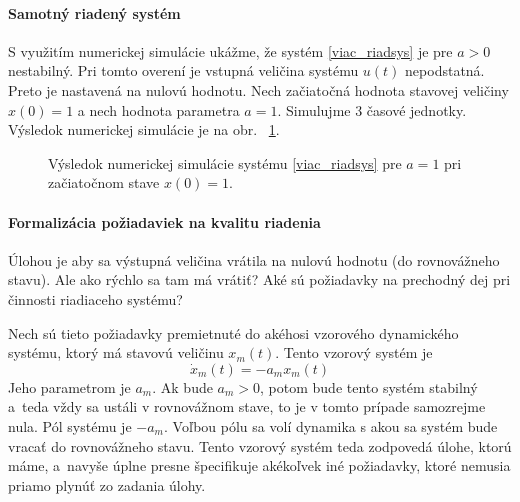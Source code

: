 \documentclass[a4paper, 10pt, ]{article}
\begin{document}
\bigskip



\paragraph{Samotný riadený systém}

\noindent
S využitím numerickej simulácie ukážme, že systém \eqref{viac_riadsys} je pre $a>0$ nestabilný. Pri tomto overení je vstupná veličina systému $u(t)$ nepodstatná. Preto je nastavená na nulovú hodnotu. Nech začiatočná hodnota stavovej veličiny $x(0) = 1$ a nech hodnota parametra $a = 1$. Simulujme 3 časové jednotky. Výsledok numerickej simulácie  je na obr.~ \ref{Výsledok numerickej simulácie systému}.



\begin{figure}[!ht]
	\centering
	\caption{Výsledok numerickej simulácie systému \eqref{viac_riadsys} pre $a = 1$ pri začiatočnom stave $x(0) = 1$.}
	\label{Výsledok numerickej simulácie systému}
\end{figure}


\paragraph{Formalizácia požiadaviek na kvalitu riadenia}

Úlohou je aby sa výstupná veličina vrátila na nulovú hodnotu (do rovnovážneho stavu). Ale ako rýchlo sa tam má vrátiť? Aké sú požiadavky na prechodný dej pri činnosti riadiaceho systému?

Nech sú tieto požiadavky premietnuté do akéhosi vzorového dynamického systému, ktorý má stavovú veličinu $x_m(t)$. Tento vzorový systém je
\begin{equation} \label{viac_refmodel}
	\dot x_m(t) = -a_m x_m(t)
\end{equation}
Jeho parametrom je $a_m$. Ak bude $a_m > 0$, potom bude tento systém stabilný a~teda vždy sa ustáli v rovnovážnom stave, to je v tomto prípade samozrejme nula. Pól systému je $-a_m$. Voľbou pólu sa volí dynamika s akou sa systém bude vracať do rovnovážneho stavu. Tento vzorový systém teda zodpovedá úlohe, ktorú máme, a~navyše úplne presne špecifikuje akékoľvek iné požiadavky, ktoré nemusia priamo plynúť zo zadania úlohy.
\end{document}
